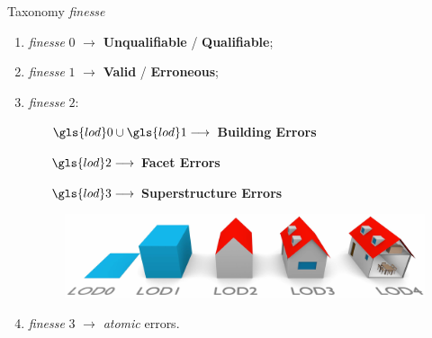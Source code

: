 \documentclass{beamer}
\begin{document}
            \begin{frame}{Taxonomy \emph{finesse}}
                \begin{enumerate}[label = (\roman*)., font=\color{IGNGreen}]
                    \item<1-> \emph{finesse} $0$ $\longrightarrow$ \textbf{Unqualifiable} / \textbf{Qualifiable};
                    \item<2-> \emph{finesse} $1$ $\longrightarrow$ \textbf{Valid} / \textbf{Erroneous};
                    \item<3-> \emph{finesse} $2$:
                    \begin{itemize}[leftmargin=12em, font=\color{IGNDarkOrange}]
                        \item[$\gls{lod}0 \cup \gls{lod}1 \longrightarrow$] \textbf{Building Errors}
                        \item[$\gls{lod}2 \longrightarrow$] \textbf{Facet Errors}
                        \item[$\gls{lod}3 \longrightarrow$] \textbf{Superstructure Errors}
                    \end{itemize}
                    \begin{figure}[H]
                        \begin{center}
                            \includegraphics[height=.2\textheight]{images/citygml_lod}
                        \end{center}
                    \end{figure}
                    \item<4-> \emph{finesse} $3$ $\longrightarrow$ \emph{atomic} errors.
                \end{enumerate}

            \end{frame}
\end{document}
